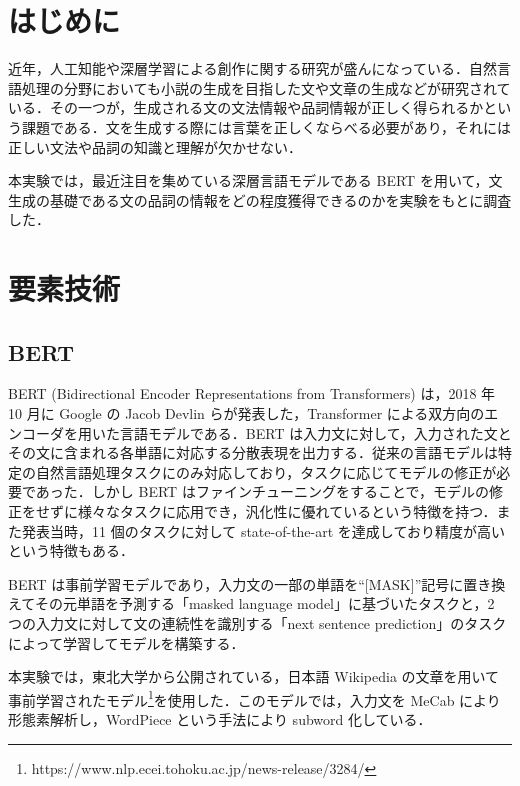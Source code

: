\documentclass[twocolumn]{jarticle}
\begin{document}

\section{はじめに}
近年，人工知能や深層学習による創作に関する研究が盛んになっている．自然言語処理の分野においても小説の生成を目指した文や文章の生成などが研究されている．その一つが，生成される文の文法情報や品詞情報が正しく得られるかという課題である．文を生成する際には言葉を正しくならべる必要があり，それには正しい文法や品詞の知識と理解が欠かせない．\par
本実験では，最近注目を集めている深層言語モデルである BERT を用いて，文生成の基礎である文の品詞の情報をどの程度獲得できるのかを実験をもとに調査した．


\section{要素技術}

  \subsection{BERT}
BERT (Bidirectional Encoder Representations from Transformers)\cite{DBLP} は，2018 年 10 月に Google の Jacob Devlin らが発表した，Transformer による双方向のエンコーダを用いた言語モデルである．BERT は入力文に対して，入力された文とその文に含まれる各単語に対応する分散表現を出力する．従来の言語モデルは特定の自然言語処理タスクにのみ対応しており，タスクに応じてモデルの修正が必要であった．しかし BERT はファインチューニングをすることで，モデルの修正をせずに様々なタスクに応用でき，汎化性に優れているという特徴を持つ．また発表当時，11 個のタスクに対して state-of-the-art を達成しており精度が高いという特徴もある．\par
BERT は事前学習モデルであり，入力文の一部の単語を“[MASK]”記号に置き換えてその元単語を予測する「masked language model」に基づいたタスクと，2 つの入力文に対して文の連続性を識別する「next sentence prediction」のタスクによって学習してモデルを構築する．\par
本実験では，東北大学から公開されている，日本語 Wikipedia の文章を用いて事前学習されたモデル\footnote{https://www.nlp.ecei.tohoku.ac.jp/news-release/3284/}を使用した．このモデルでは，入力文を MeCab\cite{110002911717} により形態素解析し，WordPiece という手法により subword 化している．
\end{document}
